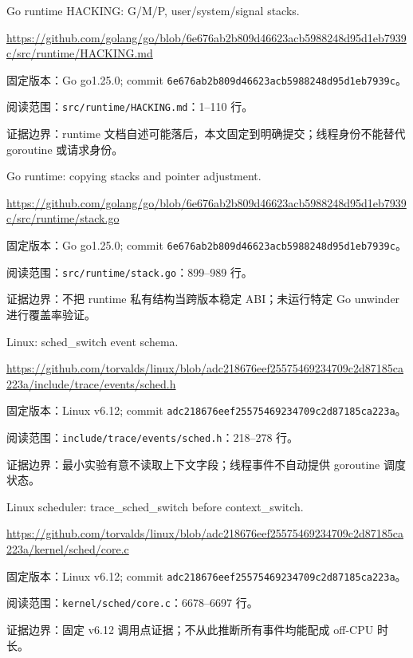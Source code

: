 \documentclass[UTF8,fontset=fandol,openany,11pt]{ctexbook}
\begin{document}
\begin{thebibliography}{999}
 Go runtime HACKING: G/M/P, user/system/signal stacks.\par
\url{https://github.com/golang/go/blob/6e676ab2b809d46623acb5988248d95d1eb7939c/src/runtime/HACKING.md}\par
{\small\raggedright 固定版本：Go go1.25.0; commit \texttt{6e676ab2\allowbreak{}b809d466\allowbreak{}23acb598\allowbreak{}8248d95d\allowbreak{}1eb7939c}。\par
阅读范围：\nolinkurl{src/runtime/HACKING.md}：1–110 行。\par
证据边界：runtime 文档自述可能落后，本文固定到明确提交；线程身份不能替代 goroutine 或请求身份。
}

 Go runtime: copying stacks and pointer adjustment.\par
\url{https://github.com/golang/go/blob/6e676ab2b809d46623acb5988248d95d1eb7939c/src/runtime/stack.go}\par
{\small\raggedright 固定版本：Go go1.25.0; commit \texttt{6e676ab2\allowbreak{}b809d466\allowbreak{}23acb598\allowbreak{}8248d95d\allowbreak{}1eb7939c}。\par
阅读范围：\nolinkurl{src/runtime/stack.go}：899–989 行。\par
证据边界：不把 runtime 私有结构当跨版本稳定 ABI；未运行特定 Go unwinder 进行覆盖率验证。
}

 Linux: sched\_switch event schema.\par
\url{https://github.com/torvalds/linux/blob/adc218676eef25575469234709c2d87185ca223a/include/trace/events/sched.h}\par
{\small\raggedright 固定版本：Linux v6.12; commit \texttt{adc21867\allowbreak{}6eef2557\allowbreak{}54692347\allowbreak{}09c2d871\allowbreak{}85ca223a}。\par
阅读范围：\nolinkurl{include/trace/events/sched.h}：218–278 行。\par
证据边界：最小实验有意不读取上下文字段；线程事件不自动提供 goroutine 调度状态。
}

 Linux scheduler: trace\_sched\_switch before context\_switch.\par
\url{https://github.com/torvalds/linux/blob/adc218676eef25575469234709c2d87185ca223a/kernel/sched/core.c}\par
{\small\raggedright 固定版本：Linux v6.12; commit \texttt{adc21867\allowbreak{}6eef2557\allowbreak{}54692347\allowbreak{}09c2d871\allowbreak{}85ca223a}。\par
阅读范围：\nolinkurl{kernel/sched/core.c}：6678–6697 行。\par
证据边界：固定 v6.12 调用点证据；不从此推断所有事件均能配成 off-CPU 时长。
}


\end{thebibliography}
\end{document}
